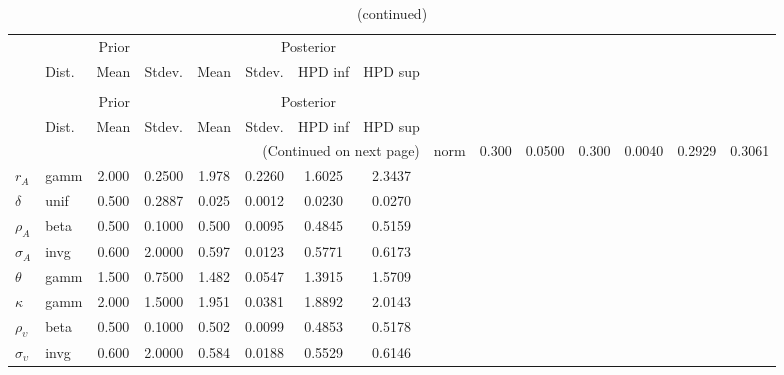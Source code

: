  
\begin{center}
\begin{longtable}{llcccccc} 
\caption{Results from Metropolis-Hastings (parameters)}
 \label{Table:MHPosterior:1}\\
\toprule 
  & \multicolumn{3}{c}{Prior}  &  \multicolumn{4}{c}{Posterior} \\
  \cmidrule(r{.75em}){2-4} \cmidrule(r{.75em}){5-8}
  & Dist. & Mean  & Stdev. & Mean & Stdev. & HPD inf & HPD sup\\
\midrule \endfirsthead 
\caption{(continued)}\\\toprule 
  & \multicolumn{3}{c}{Prior}  &  \multicolumn{4}{c}{Posterior} \\
  \cmidrule(r{.75em}){2-4} \cmidrule(r{.75em}){5-8}
  & Dist. & Mean  & Stdev. & Mean & Stdev. & HPD inf & HPD sup\\
\midrule \endhead 
\bottomrule \multicolumn{8}{r}{(Continued on next page)} \endfoot 
\bottomrule \endlastfoot 
${\alpha}$ & norm &   0.300 & 0.0500 &   0.300& 0.0040 &  0.2929 &  0.3061 \\ 
${r_{A}}$ & gamm &   2.000 & 0.2500 &   1.978& 0.2260 &  1.6025 &  2.3437 \\ 
${\delta}$ & unif &   0.500 & 0.2887 &   0.025& 0.0012 &  0.0230 &  0.0270 \\ 
${\rho_A}$ & beta &   0.500 & 0.1000 &   0.500& 0.0095 &  0.4845 &  0.5159 \\ 
${\sigma_A}$ & invg &   0.600 & 2.0000 &   0.597& 0.0123 &  0.5771 &  0.6173 \\ 
${\theta}$ & gamm &   1.500 & 0.7500 &   1.482& 0.0547 &  1.3915 &  1.5709 \\ 
${\kappa}$ & gamm &   2.000 & 1.5000 &   1.951& 0.0381 &  1.8892 &  2.0143 \\ 
${\rho_\upsilon}$ & beta &   0.500 & 0.1000 &   0.502& 0.0099 &  0.4853 &  0.5178 \\ 
${\sigma_\upsilon}$ & invg &   0.600 & 2.0000 &   0.584& 0.0188 &  0.5529 &  0.6146 \\ 
\end{longtable}
 \end{center}
